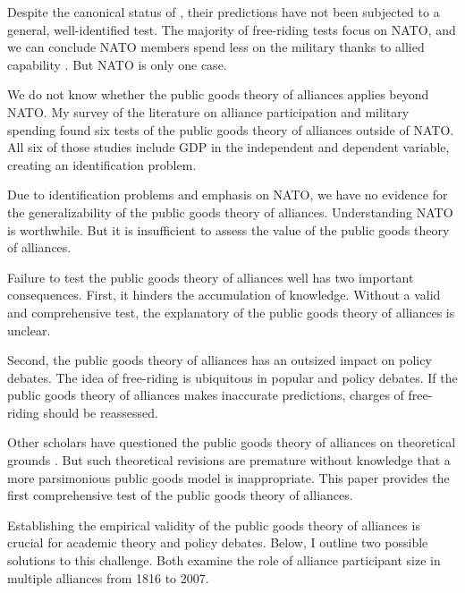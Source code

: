\documentclass[12pt]{article}
\begin{document}
Despite the canonical status of \citet{OlsonZeckhauser1966}, their predictions have not been subjected to a general, well-identified test. 
The majority of free-riding tests focus on NATO, and we can conclude NATO members spend less on the military thanks to allied capability \citep{PluemperNeumayer2015, GeorgeSandler2017}.
But NATO is only one case. 


We do not know whether the public goods theory of alliances applies beyond NATO. 
My survey of the literature on alliance participation and military spending found six tests of the public goods theory of alliances outside of NATO. 
All six of those studies include GDP in the independent and dependent variable, creating an identification problem. 


Due to identification problems and emphasis on NATO, we have no evidence for the generalizability of the public goods theory of alliances. 
Understanding NATO is worthwhile. 
But it is insufficient to assess the value of the public goods theory of alliances. 


Failure to test the public goods theory of alliances well has two important consequences. 
First, it hinders the accumulation of knowledge. 
Without a valid and comprehensive test, the explanatory of the public goods theory of alliances is unclear. 


Second, the public goods theory of alliances has an outsized impact on policy debates. 
The idea of free-riding is ubiquitous in popular and policy debates. 
If the public goods theory of alliances makes inaccurate predictions, charges of free-riding should be reassessed.


Other scholars have questioned the public goods theory of alliances on theoretical grounds \citep{Palmer1990, SandlerHartley2001}.  
But such theoretical revisions are premature without knowledge that a more parsimonious public goods model is inappropriate. 
This paper provides the first comprehensive test of the public goods theory of alliances.  


Establishing the empirical validity of the public goods theory of alliances is crucial for academic theory and policy debates. 
Below, I outline two possible solutions to this challenge. 
Both examine the role of alliance participant size in multiple alliances from 1816 to 2007. 
\end{document}
